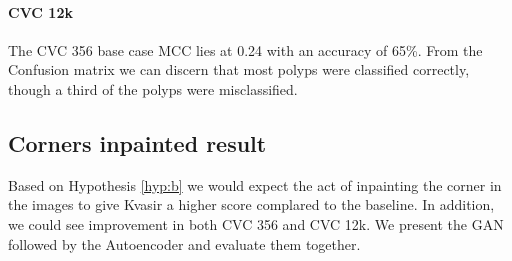 \paragraph{CVC 12k}
The CVC 356 base case MCC lies at 0.24 with an accuracy of 65\%. 
From the Confusion matrix we can discern that most polyps were classified correctly, though a third of the polyps were misclassified.





\FloatBarrier
\subsection{Corners inpainted result}
Based on Hypothesis \ref{hyp:b} we would expect the act of inpainting the corner in the images to give Kvasir a higher score complared to the baseline. In addition, we could see improvement in both CVC 356 and CVC 12k.
We present the GAN followed by the Autoencoder and evaluate them together.


